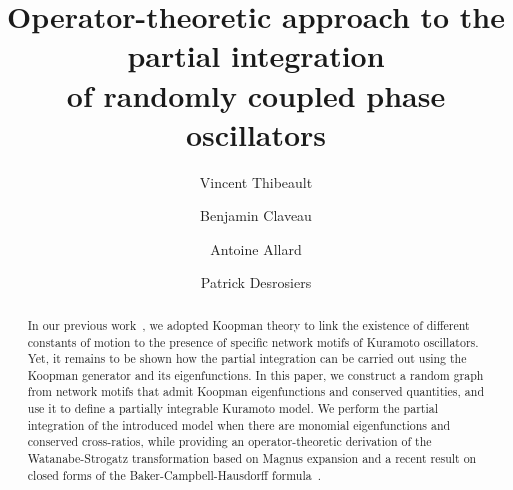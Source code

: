\documentclass[aps,pre,reprint,longbibliography,superscriptaddress,noshowpacs,floatfix]{revtex4-2}
\theoremstyle{definition}
\theoremstyle{remark}
\begin{document}
\title{Operator-theoretic approach to the partial integration\\ of randomly coupled phase oscillators}


\author{Vincent Thibeault}

\author{Benjamin Claveau}%

\author{Antoine Allard}%

\author{Patrick Desrosiers}%


\begin{abstract}

In our previous work~\cite{Thibeault2026}, we adopted Koopman theory to link the existence of different constants of motion to the presence of specific network motifs of Kuramoto oscillators. Yet, it remains to be shown how the partial integration can be carried out using the Koopman generator and its eigenfunctions. In this paper, we construct a random graph from network motifs that admit Koopman eigenfunctions and conserved quantities, and use it to define a partially integrable Kuramoto model. We perform the partial integration of the introduced model when there are monomial eigenfunctions and conserved cross-ratios, while providing an operator-theoretic derivation of the Watanabe-Strogatz transformation based on Magnus expansion and a recent result on closed forms of the Baker-Campbell-Hausdorff formula~\cite{Matone2015}. %
\end{abstract}
\end{document}
